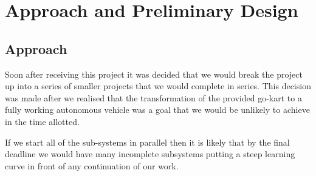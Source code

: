 \chapter{Approach and Preliminary Design}

\section{Approach}
Soon after receiving this project it was decided that we would break the project up into a series of smaller projects that we would complete in series. This decision was made after we realised that the transformation of the provided go-kart to a fully working autonomous vehicle was a goal that we would be unlikely to achieve in the time allotted.

If we start all of the sub-systems in parallel then it is likely that by the final deadline we would have many incomplete subsystems putting a steep learning curve in front of any continuation of our work.

